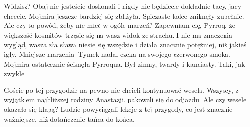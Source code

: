 \ds{} Widzisz? Obaj nie jesteście doskonali i nigdy nie będziecie dokładnie tacy, jacy chcecie. \dm{} Mojmira jeszcze bardziej się zbliżyła.
Spiczaste kolce zniknęły zupełnie. \dm{} Ale czy to powód, żeby nie mieć w ogóle marzeń?
Zapewniam cię, Pyrroq, że większość kosmitów trzęsie się na wasz widok ze strachu. I nie ma znaczenia wygląd, wasza zła sława niesie się wszędzie i działa znacznie potężniej, niż jakieś igły.
Mniejsze marzenia, Tymek nadal czeka na swojego czerwonego smoka.
\dm{} Mojmira ostatecznie ścisnęła Pyrroqua. 
Był zimny, twardy i kanciasty. Taki, jak zwykle. \de{}

Goście po tej przygodzie na pewno nie chcieli kontynuować wesela. 
Wszyscy, z wyjątkiem najbliższej rodziny Anastazji, pakowali się do odjazdu.
Ale czy wesele okazało się klapą? Ludzie powyciągali lekcje z tej przygody, co jest znacznie ważniejsze, niż dotańczenie tańca do końca.















